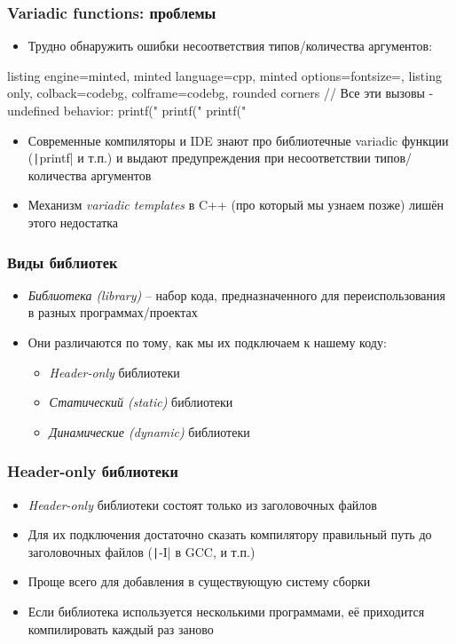 \documentclass[10pt]{beamer}
\begin{document}
\begin{frame}[fragile]
\frametitle{Variadic functions: проблемы}
\begin{itemize}
\item Трудно обнаружить ошибки несоответствия типов/количества аргументов:
\end{itemize}
\begin{tcblisting}{listing engine=minted, minted language=cpp, minted options={fontsize=\scriptsize}, listing only, colback=codebg, colframe=codebg, rounded corners}
// Все эти вызовы - undefined behavior:
printf("%
printf("%
printf("%
\end{tcblisting}
\pause
\begin{itemize}
\item Современные компиляторы и IDE знают про библиотечные variadic функции (\texttt|printf| и т.п.) и выдают предупреждения при несоответствии типов/количества аргументов
\pause
\item Механизм \textit{variadic templates} в C++ (про который мы узнаем позже) лишён этого недостатка
\end{itemize}
\end{frame}

\begin{frame}[fragile]
\frametitle{Виды библиотек}
\begin{itemize}
\item \textit{Библиотека (library)} -- набор кода, предназначенного для переиспользования в разных программах/проектах
\pause
\item Они различаются по тому, как мы их подключаем к нашему коду:
\pause
\begin{itemize}
\item \textit{Header-only} библиотеки
\pause
\item \textit{Статический (static)} библиотеки
\pause
\item \textit{Динамические (dynamic)} библиотеки
\end{itemize}
\end{itemize}
\end{frame}

\begin{frame}[fragile]
\frametitle{Header-only библиотеки}
\begin{itemize}
\item \textit{Header-only} библиотеки состоят только из заголовочных файлов
\pause
\item Для их подключения достаточно сказать компилятору правильный путь до заголовочных файлов (\texttt|-I| в GCC, и т.п.)
\pause
\item Проще всего для добавления в существующую систему сборки
\pause
\item Если библиотека используется несколькими программами, её приходится компилировать каждый раз заново
\end{itemize}
\end{frame}
\end{document}
